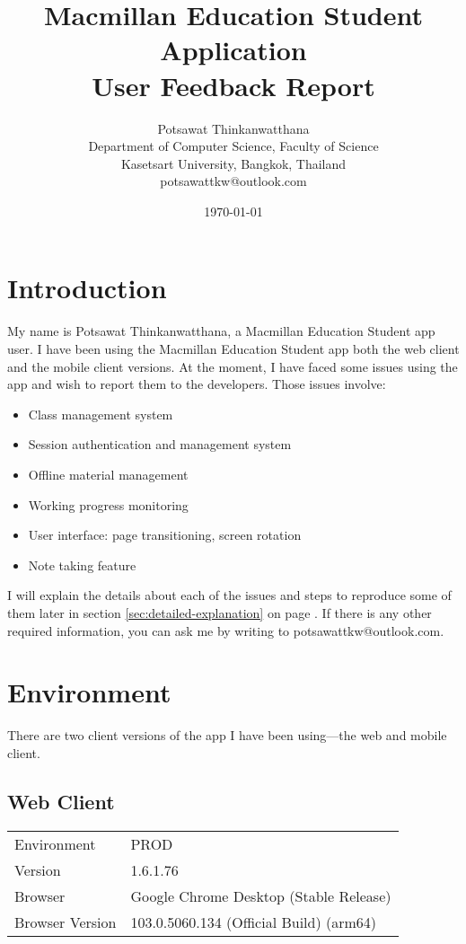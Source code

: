 \documentclass{article}
\title{Macmillan Education Student Application\\
User Feedback Report}
\author{Potsawat Thinkanwatthana\\
Department of Computer Science, Faculty of Science\\
Kasetsart University, Bangkok, Thailand\\
potsawattkw@outlook.com}
\date{\today}
\begin{document}
\begin{titlepage}
\maketitle
\thispagestyle{empty}
\tableofcontents
\end{titlepage}

\section{Introduction}
My name is Potsawat Thinkanwatthana, a Macmillan Education Student app user. I have been using the Macmillan Education Student app
both the web client and the mobile client versions. At the moment, I have faced some issues using the app
and wish to report them to the developers. Those issues involve:
\begin{itemize}
\setlength\itemsep{0ex}
    \item Class management system
    \item Session authentication and management system
    \item Offline material management
    \item Working progress monitoring
    \item User interface: page transitioning, screen rotation
    \item Note taking feature
\end{itemize}
I will explain the details about each of the issues and steps to reproduce some of them later in section \ref{sec:detailed-explanation} on page \pageref{sec:detailed-explanation}.
If there is any other required information, you can ask me by writing to potsawattkw@outlook.com.

\section{Environment}
There are two client versions of the app I have been using---the web and mobile client.

\subsection{Web Client}
\begin{tabular}{p{7em} l}
Environment     & PROD\\
Version         & 1.6.1.76\\
Browser         & Google Chrome Desktop (Stable Release)\\
Browser Version & 103.0.5060.134 (Official Build) (arm64)
\end{tabular}
\end{document}

